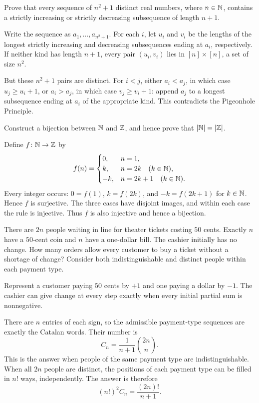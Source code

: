 \documentclass[11pt, oneside]{article}
\begin{document}
\begin{problem}
Prove that every sequence of $n^2+1$ distinct real numbers, where
$n\in\mathbb{N}$, contains a strictly increasing or strictly decreasing
subsequence of length $n+1$.
\end{problem}
\begin{solution}
Write the sequence as $a_1, \dots, a_{n^2+1}$. For each $i$, let $u_i$ and $v_i$ be the lengths of the longest
strictly increasing and decreasing subsequences ending at $a_i$,
respectively. If neither kind has length $n+1$, every pair
$(u_i, v_i)$ lies in $[n]\times[n]$, a set of size $n^2$.

But these $n^2+1$ pairs are distinct. For $i<j$, either
$a_i<a_j$, in which case $u_j\ge u_i+1$, or $a_i>a_j$,
in which case $v_j\ge v_i+1$: append $a_j$ to a longest
subsequence ending at $a_i$ of the appropriate kind.
This contradicts the Pigeonhole Principle.
\end{solution}

\begin{problem}
Construct a bijection between $\mathbb{N}$ and $\mathbb{Z}$, and hence prove that
$|\mathbb{N}|=|\mathbb{Z}|$.
\end{problem}
\begin{solution}
Define $f\colon\mathbb{N}\to\mathbb{Z}$ by
\[
f(n)=
\begin{cases}
0, & n=1, \\
k, & n=2k\quad(k\in\mathbb{N}), \\
-k, & n=2k+1\quad(k\in\mathbb{N}).
\end{cases}
\]
Every integer occurs: $0=f(1)$, $k=f(2k)$, and
$-k=f(2k+1)$ for $k\in\mathbb{N}$. Hence $f$ is surjective.
The three cases have disjoint images, and within each case the rule is
injective. Thus $f$ is also injective and hence a bijection.
\end{solution}

\begin{problem}
There are $2n$ people waiting in line for theater tickets costing $50$ cents.
Exactly $n$ have a $50$-cent coin and $n$ have a one-dollar bill. The cashier
initially has no change. How many orders allow every customer to buy a
ticket without a shortage of change? Consider both indistinguishable
and distinct people within each payment type.
\end{problem}
\begin{solution}
Represent a customer paying $50$ cents by $+1$ and one paying a
dollar by $-1$. The cashier can give change at every step exactly when
every initial partial sum is nonnegative.

There are $n$ entries of each sign, so the admissible payment-type
sequences are exactly the Catalan words. Their number is
\[
C_n=\frac{1}{n+1}\binom{2n}{n}.
\]
This is the answer when people of the same payment type are
indistinguishable. When all $2n$ people are distinct, the positions of
each payment type can be filled in $n!$ ways, independently. The answer
is therefore
\[
(n!)^2C_n=\frac{(2n)!}{n+1}.
\]
\end{solution}
\end{document}
